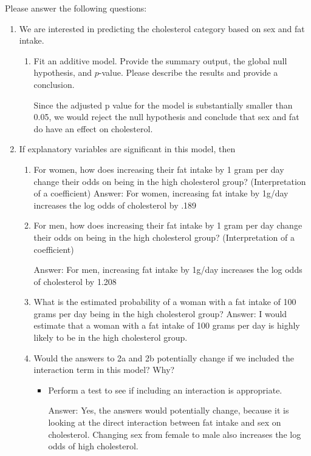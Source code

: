 \documentclass[12pt,letterpaper]{article}
\begin{document}
\newpage
\noindent Please answer the following questions:

\begin{enumerate}
	\item
	We are interested in predicting the cholesterol category based on sex and fat intake.
	\begin{enumerate}
		\item
		Fit an additive model. Provide the summary output, the global null hypothesis, and $p$-value. Please describe the results and provide a conclusion.
		
		  
		
		Since the adjusted p value for the model is substantially smaller than 0.05, we would reject the null hypothesis and conclude that sex and fat do have an effect on cholesterol.

	\end{enumerate}
	
	\item
	If explanatory variables are significant in this model, then
	\begin{enumerate}
		\item
		For women, how does increasing their fat intake by 1 gram per day change their odds on being in the high cholesterol group? (Interpretation of a coefficient)
		Answer: For women, increasing fat intake by 1g/day increases the log odds of cholesterol by .189

		\item
		For men, how does increasing their fat intake by 1 gram per day change their odds on being in the high cholesterol group? (Interpretation of a coefficient)
		
		 
		
		Answer: For men, increasing fat intake by 1g/day increases the log odds of cholesterol by 1.208

		\item
		What is the estimated probability of a woman with a fat intake of 100 grams per day being in the high cholesterol group? 
		Answer: I would estimate that a woman with a fat intake of 100 grams per day is highly likely to be in the high cholesterol group.
		
		\item
		Would the answers to 2a and 2b potentially change if we included the interaction term in this model? Why? 
		\begin{itemize}
			\item Perform a test to see if including an interaction is appropriate.
			
		 
		
		Answer: Yes, the answers would potentially change, because it is looking at the direct interaction between fat intake and sex on cholesterol. Changing sex from female to male 		also increases the log odds of high cholesterol.
			
		\end{itemize}
		
	\end{enumerate}
\end{enumerate}
\end{document}
